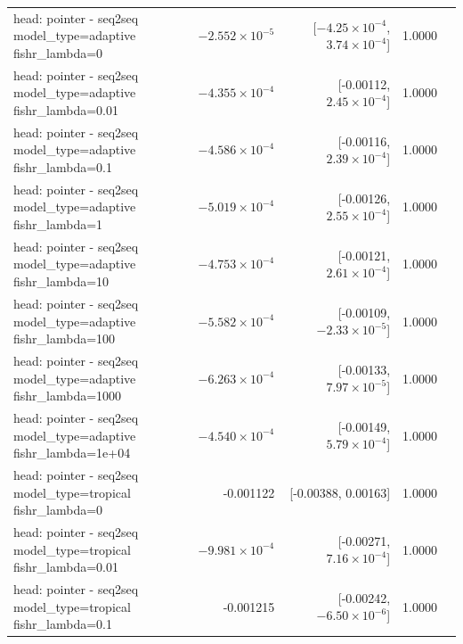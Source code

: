 \documentclass[10pt]{article}
\makeatletter
\newcommand{\stackcell}[1]{\begin{tabular}[t]{@{}l@{}}#1\end{tabular}}
\makeatother
\begin{document}
{\begin{longtable}{lrrrl}
\stackcell{head: pointer - seq2seq\\\footnotesize model\_type=adaptive fishr\_lambda=0 } & $-2.552\times10^{-5}$ & [$-4.25\times10^{-4}$, $3.74\times10^{-4}$] & 1.0000 & \\
\stackcell{head: pointer - seq2seq\\\footnotesize model\_type=adaptive fishr\_lambda=0.01 } & $-4.355\times10^{-4}$ & [-0.00112, $2.45\times10^{-4}$] & 1.0000 & \\
\stackcell{head: pointer - seq2seq\\\footnotesize model\_type=adaptive fishr\_lambda=0.1 } & $-4.586\times10^{-4}$ & [-0.00116, $2.39\times10^{-4}$] & 1.0000 & \\
\stackcell{head: pointer - seq2seq\\\footnotesize model\_type=adaptive fishr\_lambda=1 } & $-5.019\times10^{-4}$ & [-0.00126, $2.55\times10^{-4}$] & 1.0000 & \\
\stackcell{head: pointer - seq2seq\\\footnotesize model\_type=adaptive fishr\_lambda=10 } & $-4.753\times10^{-4}$ & [-0.00121, $2.61\times10^{-4}$] & 1.0000 & \\
\stackcell{head: pointer - seq2seq\\\footnotesize model\_type=adaptive fishr\_lambda=100 } & $-5.582\times10^{-4}$ & [-0.00109, $-2.33\times10^{-5}$] & 1.0000 & \\
\stackcell{head: pointer - seq2seq\\\footnotesize model\_type=adaptive fishr\_lambda=1000 } & $-6.263\times10^{-4}$ & [-0.00133, $7.97\times10^{-5}$] & 1.0000 & \\
\stackcell{head: pointer - seq2seq\\\footnotesize model\_type=adaptive fishr\_lambda=1e+04 } & $-4.540\times10^{-4}$ & [-0.00149, $5.79\times10^{-4}$] & 1.0000 & \\
\stackcell{head: pointer - seq2seq\\\footnotesize model\_type=tropical fishr\_lambda=0 } & -0.001122 & [-0.00388, 0.00163] & 1.0000 & \\
\stackcell{head: pointer - seq2seq\\\footnotesize model\_type=tropical fishr\_lambda=0.01 } & $-9.981\times10^{-4}$ & [-0.00271, $7.16\times10^{-4}$] & 1.0000 & \\
\stackcell{head: pointer - seq2seq\\\footnotesize model\_type=tropical fishr\_lambda=0.1 } & -0.001215 & [-0.00242, $-6.50\times10^{-6}$] & 1.0000 & \\

\end{longtable}}
\end{document}
